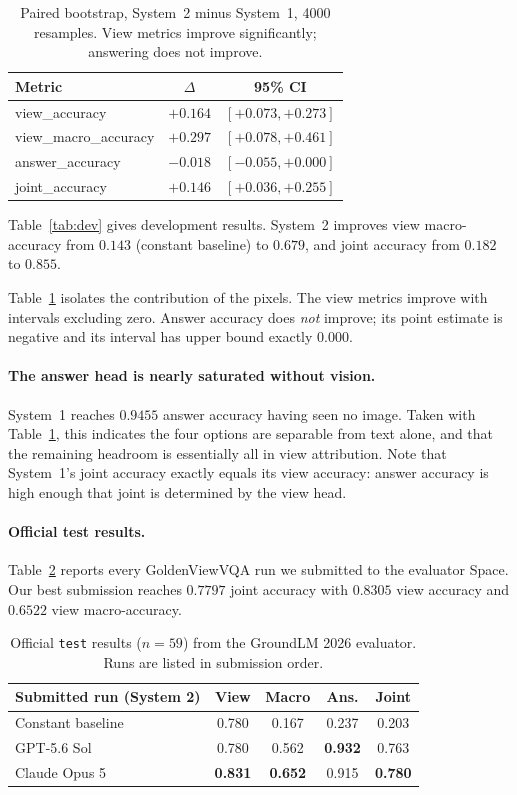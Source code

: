 \documentclass[11pt]{article}
\begin{document}
\begin{table}[t]
\centering\small
\begin{tabular}{@{}lcc@{}}
\toprule
Metric & $\Delta$ & 95\% CI \\
\midrule
view\_accuracy       & $+0.164$ & $[+0.073,+0.273]$ \\
view\_macro\_accuracy& $+0.297$ & $[+0.078,+0.461]$ \\
answer\_accuracy     & $-0.018$ & $[-0.055,+0.000]$ \\
joint\_accuracy      & $+0.146$ & $[+0.036,+0.255]$ \\
\bottomrule
\end{tabular}
\caption{Paired bootstrap, System~2 minus System~1, 4000 resamples. View
metrics improve significantly; answering does not improve.}
\label{tab:paired}
\end{table}

Table~\ref{tab:dev} gives development results. System~2 improves view
macro-accuracy from $0.143$ (constant baseline) to $0.679$, and joint accuracy
from $0.182$ to $0.855$.

Table~\ref{tab:paired} isolates the contribution of the pixels. The view
metrics improve with intervals excluding zero. Answer accuracy does
\emph{not} improve; its point estimate is negative and its interval has upper
bound exactly $0.000$.

\paragraph{The answer head is nearly saturated without vision.} System~1
reaches $0.9455$ answer accuracy having seen no image. Taken with
Table~\ref{tab:paired}, this indicates the four options are separable from
text alone, and that the remaining headroom is essentially all in view
attribution. Note that System~1's joint accuracy exactly equals its view
accuracy: answer accuracy is high enough that joint is determined by the view
head.

\paragraph{Official test results.} Table~\ref{tab:test} reports every
GoldenViewVQA run we submitted to the evaluator Space. Our best submission
reaches $0.7797$ joint accuracy with $0.8305$ view accuracy and $0.6522$ view
macro-accuracy.

\begin{table}[t]
\centering\small\setlength{\tabcolsep}{4pt}
\begin{tabular}{@{}lcccc@{}}
\toprule
Submitted run (System 2) & View & Macro & Ans. & Joint \\
\midrule
Constant baseline & 0.780 & 0.167 & 0.237 & 0.203 \\
GPT-5.6 Sol & 0.780 & 0.562 & \textbf{0.932} & 0.763 \\
Claude Opus 5 & \textbf{0.831} & \textbf{0.652} & 0.915 & \textbf{0.780} \\
\bottomrule
\end{tabular}
\caption{Official \texttt{test} results ($n=59$) from the GroundLM 2026
evaluator. Runs are listed in submission order.}
\label{tab:test}
\end{table}
\end{document}
